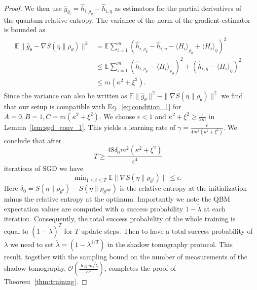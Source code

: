 \documentclass[
    aps,
    prx,
    floatfix,
    nofootinbib,
    onecolumn
]{revtex4-2}
\begin{document}
\begin{proof}
We then use $\hat{g}_{\theta_i} = \hat{h}_{i, \rho_\theta} - \hat{h}_{i, \eta}$ as estimators for the partial derivatives of the quantum relative entropy. The variance of the norm of the gradient estimator is bounded as
\begin{align}
\begin{split}
\label{eq:grad_bounded_variance}
    \mathbb{E} \|\hat{g}_\theta - \nabla S(\eta \|\rho_\theta) \|^2 &=
    \mathbb{E} \sum_{i=1}^m (\hat{h}_{i, \rho_\theta} - \hat{h}_{i, \eta} - \langle H_i \rangle_{\rho_\theta} + \langle H_i\rangle_\eta )^2 \\
    &\leq \mathbb{E}\sum_{i=1}^m (\hat{h}_{i, \rho_\theta} - \langle H_i \rangle_{\rho_\theta} )^2 + (\hat{h}_{i, \eta} - \langle H_i\rangle_\eta )^2 \\
    &\leq m ( \kappa^2 + \xi^2).
\end{split}
\end{align} 
Since the variance can also be written as $\mathbb{E} \|\hat{g}_\theta \|^2 - \| \nabla S(\eta \|\rho_\theta) \|^2$ we find that our setup is compatible with Eq.~\eqref{eq:condition_1} for $A=0, B=1, C=m ( \kappa^2 + \xi^2)$. We choose $\epsilon<1$ and $\kappa^2 + \xi^2 \geq \frac{\epsilon}{2m}$ in Lemma~\ref{lem:sgd_conv_1}. This yields a learning rate of $\gamma = \frac{\epsilon}{ 4 m^2 (\kappa^2 + \xi^2)}$. We conclude that after 
\begin{equation}
    T \geq \frac{48 \delta_0 m^2 ( \kappa^2 + \xi^2)}{\epsilon^4}
\end{equation}
iterations of SGD we have
\begin{equation}
    \mathrm{min}_{1\leq t \leq T} \; \mathbb{E}\|\nabla S(\eta \|\rho_{\theta^t}) \| \leq \epsilon. 
\end{equation} 
Here $\delta_0 = S(\eta\|\rho_{\theta^0})-S(\eta\|\rho_{\theta^\mathrm{opt}})$ is the relative entropy at the initialization minus the relative entropy at the optimum. Importantly we note the QBM expectation values are computed with a success probability $1-\tilde{\lambda}$ at each iteration. Consequently, the total success probability of the whole training is equal to $(1-\tilde{\lambda})^T$ for $T$ update steps. Then to have a total success probability of $\lambda$ we need to set $\tilde{\lambda}=(1-\lambda^{1/T})$ in the shadow tomography protocol. This result, together with the sampling bound on the number of measurements of the shadow tomography, $\mathcal{O}(\frac{\log{m/\tilde{\lambda}}}{\kappa^4})$, completes the proof of Theorem~\ref{thm:training}.
\end{proof}
\end{document}
